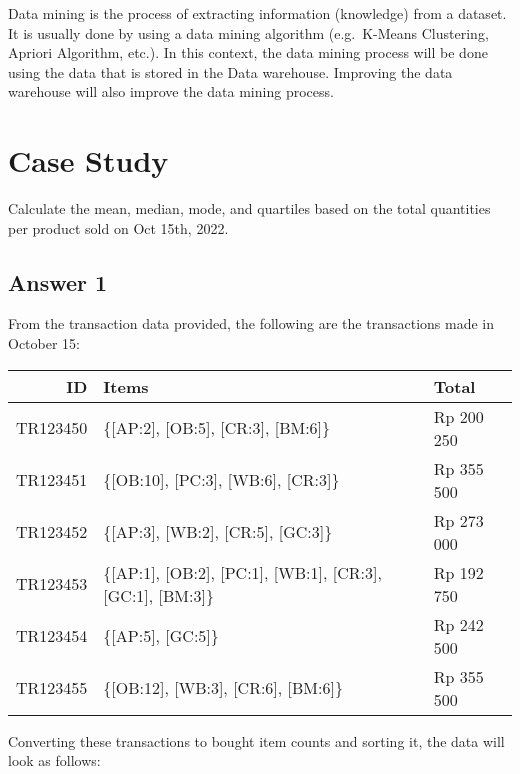 \documentclass[
  11pt, %
]{assignment}
\begin{document}
Data mining is the process of extracting information (knowledge) from a dataset. It is usually done by using a data mining algorithm (e.g.\ K-Means Clustering, Apriori Algorithm, etc.). In this context, the data mining process will be done using the data that is stored in the Data warehouse. Improving the data warehouse will also improve the data mining process.

\pagebreak

\section*{Case Study}

\begin{problem}
Calculate the mean, median, mode, and quartiles based on the total quantities per product sold on Oct 15th, 2022.
\end{problem}

\subsection*{Answer 1}

From the transaction data provided, the following are the transactions made in October 15:

\medskip

\begin{center}
	\begin{tabular}{r | l | l }
		ID       & Items                                                      & Total      \\
		\toprule
		TR123450 & \{[AP:2], [OB:5], [CR:3], [BM:6]\}                         & Rp 200 250 \\
		TR123451 & \{[OB:10], [PC:3], [WB:6], [CR:3]\}                        & Rp 355 500 \\
		TR123452 & \{[AP:3], [WB:2], [CR:5], [GC:3]\}                         & Rp 273 000 \\
		TR123453 & \{[AP:1], [OB:2], [PC:1], [WB:1], [CR:3], [GC:1], [BM:3]\} & Rp 192 750 \\
		TR123454 & \{[AP:5], [GC:5]\}                                         & Rp 242 500 \\
		TR123455 & \{[OB:12], [WB:3], [CR:6], [BM:6]\}                        & Rp 355 500 \\
		\bottomrule
	\end{tabular}
\end{center}

\medskip

Converting these transactions to bought item counts and sorting it, the data will look as follows:
\end{document}

